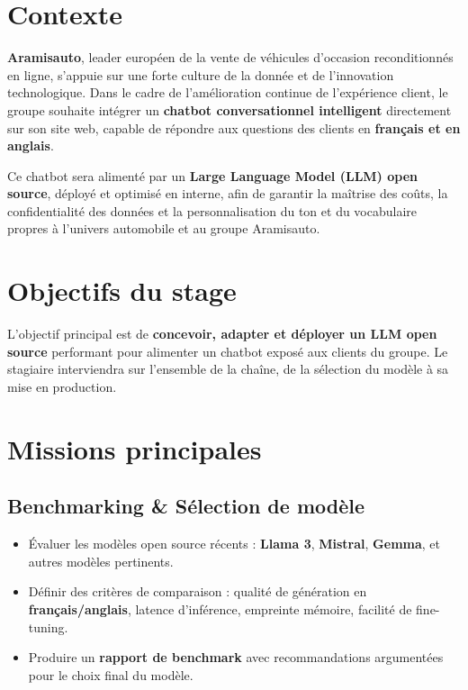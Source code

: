 \documentclass[12pt,a4paper]{article}
\begin{document}

\section{Contexte}

\textbf{Aramisauto}, leader européen de la vente de véhicules d'occasion reconditionnés en ligne, s'appuie sur une forte culture de la donnée et de l'innovation technologique. Dans le cadre de l'amélioration continue de l'expérience client, le groupe souhaite intégrer un \textbf{chatbot conversationnel intelligent} directement sur son site web, capable de répondre aux questions des clients en \textbf{français et en anglais}.

Ce chatbot sera alimenté par un \textbf{Large Language Model (LLM) open source}, déployé et optimisé en interne, afin de garantir la maîtrise des coûts, la confidentialité des données et la personnalisation du ton et du vocabulaire propres à l'univers automobile et au groupe Aramisauto.

\section{Objectifs du stage}

L'objectif principal est de \textbf{concevoir, adapter et déployer un LLM open source} performant pour alimenter un chatbot exposé aux clients du groupe. Le stagiaire interviendra sur l'ensemble de la chaîne, de la sélection du modèle à sa mise en production.

\section{Missions principales}

\subsection{Benchmarking \& Sélection de modèle}

\begin{itemize}[leftmargin=1.5em, itemsep=4pt]
    \item Évaluer les modèles open source récents : \textbf{Llama 3}, \textbf{Mistral}, \textbf{Gemma}, et autres modèles pertinents.
    \item Définir des critères de comparaison : qualité de génération en \textbf{français/anglais}, latence d'inférence, empreinte mémoire, facilité de fine-tuning.
    \item Produire un \textbf{rapport de benchmark} avec recommandations argumentées pour le choix final du modèle.
\end{itemize}
\end{document}
